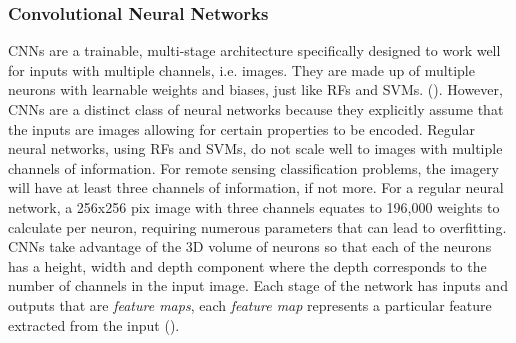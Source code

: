 \subsubsection{Convolutional Neural Networks}
CNNs are a trainable, multi-stage architecture specifically designed to work well for inputs with multiple channels, i.e. images. They are made up of multiple neurons with learnable weights and biases, just like RFs and SVMs.  (\cite{Karpathy1}). However, CNNs are a distinct class of neural networks because they explicitly assume that the inputs are images allowing for certain properties to be encoded. Regular neural networks, using RFs and SVMs, do not scale well to images with multiple channels of information. For remote sensing classification problems, the imagery will have at least three channels of information, if not more. For a regular neural network, a 256x256 pix image with three channels equates to 196,000 weights to calculate per neuron, requiring numerous parameters that can lead to overfitting. CNNs take advantage of the 3D volume of neurons so that each of the neurons has a height, width and depth component where the depth corresponds to the number of channels in the input image. Each stage of the network has inputs and outputs that are \textit{feature maps}, each \textit{feature map} represents a particular feature extracted from the input (\cite{lecun10}).

